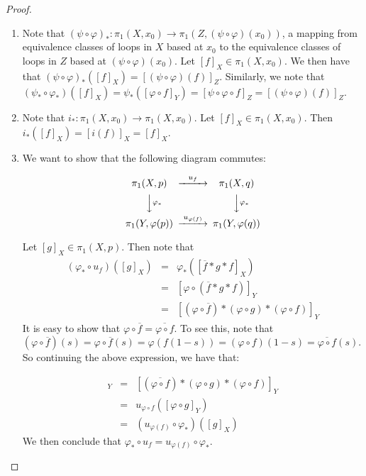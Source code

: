 \documentclass{article}
\renewcommand{\phi}{\varphi}
\theoremstyle{definition}
\begin{document}
\begin{proof}
\text{}
\begin{enumerate}
	\item Note that $(\psi \circ \phi)_\ast : \pi_1(X,x_0 ) \to \pi_1(Z,(\psi \circ \phi)(x_0) )$, a mapping from equivalence classes of loops in $X$ based at $x_0$ to the equivalence classes of loops in $Z$ based at $(\psi\circ \phi)(x_0)$. Let $[f]_X \in \pi_1(X,x_0)$.
We then have that $(\psi \circ \phi)_\ast ([f]_X) = [(\psi \circ \phi)(f)]_Z$. Similarly, we note that $(\psi_\ast \circ \phi_\ast ) ([f]_X)  = \psi_\ast ([\phi\circ f]_Y) = [\psi \circ \phi \circ f ]_Z = [(\psi \circ \phi)(f) ]_Z$. 
	\item Note that $i_\ast : \pi_1 (X,x_0) \to \pi_1 (X,x_0)$. Let $[f]_X \in \pi_1(X,x_0)$. Then $i_\ast ([f]_X) = [i(f)]_X = [f]_X$. 
	\item We want to show that the following diagram commutes:

$$
\begin{CD}
\pi_1(X,p) @>u_f>> \pi_1(X,q)\\
@VV{\phi_\ast} V @VV{\phi_{\ast}}V\\
\pi_1(Y,\phi(p)) @>u_{\phi(f)}>> \pi_1 (Y,\phi(q))
\end{CD}
$$

Let $[g]_X\in \pi_1(X,p)$. Then note that
\begin{eqnarray*}
(\phi_\ast \circ u_f)([g]_X) &=& \phi_\ast ([\overline{f}\ast g \ast f]_X) \\
&= &[ \phi \circ(\overline{f} \ast g \ast f) ]_Y\\
&=& [(\phi\circ \overline{f}) \ast (\phi \circ g) \ast (\phi\circ f) ] _Y
\end{eqnarray*}
It is easy to show that $\phi \circ \overline{f} = \overline{\phi \circ f}$. To see this, note that
$(\phi \circ \overline{f})(s) = \phi \circ \overline{f}(s) = \phi (f(1-s)) = (\phi \circ f) (1-s) = \overline{\phi \circ f}(s)$. So continuing the above expression, we have that:

\begin{eqnarray*}[(\phi\circ \overline{f}) \ast (\phi \circ g) \ast (\phi\circ f) ] _Y&=& [ (\overline{\phi \circ f}) \ast (\phi \circ g) \ast (\phi \circ f) ] _Y \\
&=& u_{\phi\circ f} ([\phi \circ g]_Y)\\
& =& (u_{\phi(f)} \circ \phi_\ast )([g]_X)
\end{eqnarray*}
We then conclude that $\phi_\ast \circ u_f = u_{\phi(f)} \circ \phi_\ast$.
\end{enumerate}
\end{proof}
\end{document}

